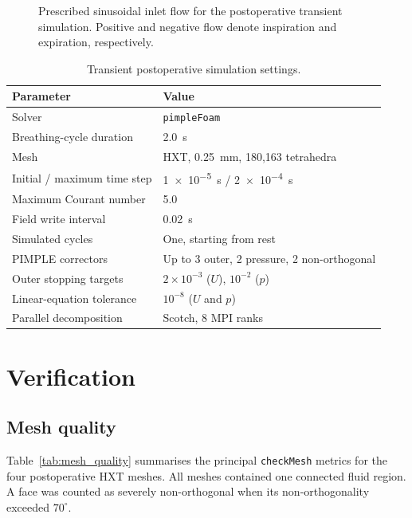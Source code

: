 \documentclass[11pt,a4paper]{article}
\begin{document}
\begin{figure}[htbp]
  \centering
  \resizebox{0.88\textwidth}{!}{}
  \caption{Prescribed sinusoidal inlet flow for the postoperative transient
  simulation. Positive and negative flow denote inspiration and expiration,
  respectively.}
  \label{fig:transient_waveform}
\end{figure}

\begin{table}[htbp]
  \centering
  \caption{Transient postoperative simulation settings.}
  \label{tab:transient_settings}
  \begin{tabular}{@{}ll@{}}
    \toprule
    Parameter & Value \\
    \midrule
    Solver & \texttt{pimpleFoam} \\
    Breathing-cycle duration & \SI{2.0}{\second} \\
    Mesh & HXT, \SI{0.25}{\milli\metre}, 180,163 tetrahedra \\
    Initial / maximum time step & \SI{1e-5}{\second} / \SI{2e-4}{\second} \\
    Maximum Courant number & 5.0 \\
    Field write interval & \SI{0.02}{\second} \\
    Simulated cycles & One, starting from rest \\
    PIMPLE correctors & Up to 3 outer, 2 pressure, 2 non-orthogonal \\
    Outer stopping targets & $2\times10^{-3}$ ($U$), $10^{-2}$ ($p$) \\
    Linear-equation tolerance & $10^{-8}$ ($U$ and $p$) \\
    Parallel decomposition & Scotch, 8 MPI ranks \\
    \bottomrule
  \end{tabular}
\end{table}

\section{Verification}
\label{sec:verification}

\subsection{Mesh quality}

Table~\ref{tab:mesh_quality} summarises the principal \texttt{checkMesh}
metrics for the four postoperative HXT meshes. All meshes contained one
connected fluid region. A face was counted as severely non-orthogonal when its
non-orthogonality exceeded $70^\circ$.
\end{document}
